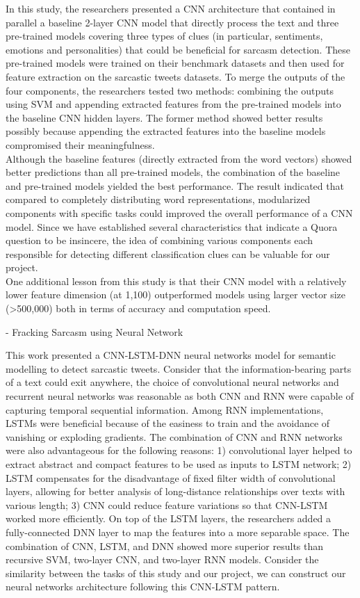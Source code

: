 \documentclass[12pt]{diazessay} %
\begin{document}
In this study, the researchers presented a CNN architecture that contained in parallel a baseline 2-layer CNN model that directly process the text and three pre-trained models covering three types of clues (in particular, sentiments, emotions and personalities) that could be beneficial for sarcasm detection. These pre-trained models were trained on their benchmark datasets and then used for feature extraction on the sarcastic tweets datasets. To merge the outputs of the four components, the researchers tested two methods: combining the outputs using SVM and appending extracted features from the pre-trained models into the baseline CNN hidden layers. The former method showed better results possibly because appending the extracted features into the baseline models compromised their meaningfulness. \\Although the baseline features (directly extracted from the word vectors) showed better predictions than all pre-trained models, the combination of the baseline and pre-trained models yielded the best performance. The result indicated that compared to completely distributing word representations, modularized components with specific tasks could improved the overall performance of a CNN model. Since we have established several characteristics that indicate a Quora question to be insincere, the idea of combining various components each responsible for detecting different classification clues can be valuable for our project. \\ One additional lesson from this study is that their CNN model with a relatively lower feature dimension (at 1,100) outperformed models using larger vector size (>500,000) both in terms of accuracy and computation speed. 

- Fracking Sarcasm using Neural Network \citep{ghosh2016}

This work presented a CNN-LSTM-DNN neural networks model for semantic modelling to detect sarcastic tweets. Consider that the information-bearing parts of a text could exit anywhere, the choice of convolutional neural networks and recurrent neural networks was reasonable as both CNN and RNN were capable of capturing temporal sequential information. Among RNN implementations, LSTMs were beneficial because of the easiness to train and the avoidance of vanishing or exploding gradients. The combination of CNN and RNN networks were also advantageous for the following reasons: 1) convolutional layer helped to extract abstract and compact features to be used as inputs to LSTM network; 2) LSTM compensates for the disadvantage of fixed filter width of convolutional layers, allowing for better analysis of long-distance relationships over texts with various length; 3) CNN could reduce feature variations so that CNN-LSTM worked more efficiently. On top of the LSTM layers, the researchers added a fully-connected DNN layer to map the features into a more separable space. The combination of CNN, LSTM, and DNN showed more superior results than recursive SVM, two-layer CNN, and two-layer RNN models. Consider the similarity between the tasks of this study and our project, we can construct our neural networks architecture following this CNN-LSTM pattern. 
\end{document}
